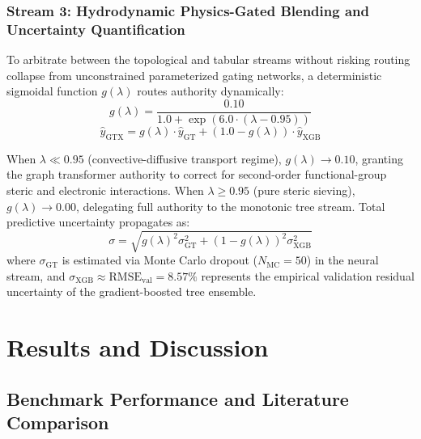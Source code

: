 \documentclass[10pt,twocolumn]{article}
\begin{document}
\subsubsection{Stream 3: Hydrodynamic Physics-Gated Blending and Uncertainty Quantification}

To arbitrate between the topological and tabular streams without risking routing collapse from unconstrained parameterized gating networks, a deterministic sigmoidal function $g(\lambda)$ routes authority dynamically:
\begin{equation}
g(\lambda) = \frac{0.10}{1.0 + \exp\left(6.0 \cdot (\lambda - 0.95)\right)}
\label{eq:gate}
\end{equation}
\begin{equation}
\hat{y}_{\mathrm{GTX}} = g(\lambda) \cdot \hat{y}_{\mathrm{GT}} + \left(1.0 - g(\lambda)\right) \cdot \hat{y}_{\mathrm{XGB}}
\label{eq:mixture}
\end{equation}

When $\lambda \ll 0.95$ (convective-diffusive transport regime), $g(\lambda) \to 0.10$, granting the graph transformer authority to correct for second-order functional-group steric and electronic interactions. When $\lambda \geq 0.95$ (pure steric sieving), $g(\lambda) \to 0.00$, delegating full authority to the monotonic tree stream. Total predictive uncertainty propagates as:
\begin{equation}
\sigma = \sqrt{g(\lambda)^2 \sigma_{\mathrm{GT}}^2 + \left(1-g(\lambda)\right)^2 \sigma_{\mathrm{XGB}}^2}
\label{eq:mixture_sigma}
\end{equation}
where $\sigma_{\mathrm{GT}}$ is estimated via Monte Carlo dropout ($N_{\mathrm{MC}} = 50$) in the neural stream, and $\sigma_{\mathrm{XGB}} \approx \mathrm{RMSE}_{\mathrm{val}} = 8.57\%$ represents the empirical validation residual uncertainty of the gradient-boosted tree ensemble.

\section{Results and Discussion}
\label{sec:results}

\subsection{Benchmark Performance and Literature Comparison}
\label{subsec:benchmark}
\end{document}
